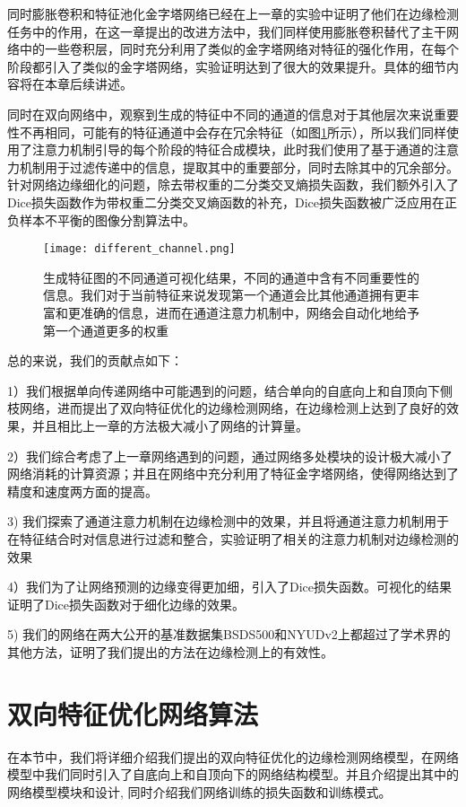 \documentclass[master]{thesis-uestc}
\begin{document}
{同时膨胀卷积和特征池化金字塔网络已经在上一章的实验中证明了他们在边缘检测任务中的作用，在这一章提出的改进方法中，我们同样使用膨胀卷积替代了主干网络中的一些卷积层，同时充分利用了类似的金字塔网络对特征的强化作用，在每个阶段都引入了类似的金字塔网络，实验证明达到了很大的效果提升。具体的细节内容将在本章后续讲述。

同时在双向网络中，观察到生成的特征中不同的通道的信息对于其他层次来说重要性不再相同，可能有的特征通道中会存在冗余特征（如图\ref{different_channel}所示），所以我们同样使用了注意力机制引导的每个阶段的特征合成模块，此时我们使用了基于通道的注意力机制用于过滤传递中的信息，提取其中的重要部分，同时去除其中的冗余部分。针对网络边缘细化的问题，除去带权重的二分类交叉熵损失函数，我们额外引入了Dice损失函数作为带权重二分类交叉熵函数的补充，Dice损失函数被广泛应用在正负样本不平衡的图像分割算法中。
\begin{figure}[h!]
    \texttt{[image: different\_channel.png]}
    \caption{生成特征图的不同通道可视化结果，不同的通道中含有不同重要性的信息。我们对于当前特征来说发现第一个通道会比其他通道拥有更丰富和更准确的信息，进而在通道注意力机制中，网络会自动化地给予第一个通道更多的权重}
    \label{different_channel}
\end{figure}

总的来说，我们的贡献点如下：

1）我们根据单向传递网络中可能遇到的问题，结合单向的自底向上和自顶向下侧枝网络，进而提出了双向特征优化的边缘检测网络，在边缘检测上达到了良好的效果，并且相比上一章的方法极大减小了网络的计算量。

2）我们综合考虑了上一章网络遇到的问题，通过网络多处模块的设计极大减小了网络消耗的计算资源；并且在网络中充分利用了特征金字塔网络，使得网络达到了精度和速度两方面的提高。

3) 我们探索了通道注意力机制在边缘检测中的效果，并且将通道注意力机制用于在特征结合时对信息进行过滤和整合，实验证明了相关的注意力机制对边缘检测的效果

4）我们为了让网络预测的边缘变得更加细，引入了Dice损失函数。可视化的结果证明了Dice损失函数对于细化边缘的效果。

5) 我们的网络在两大公开的基准数据集BSDS500和NYUDv2上都超过了学术界的其他方法，证明了我们提出的方法在边缘检测上的有效性。

\section{双向特征优化网络算法}
在本节中，我们将详细介绍我们提出的双向特征优化的边缘检测网络模型，在网络模型中我们同时引入了自底向上和自顶向下的网络结构模型。并且介绍提出其中的网络模型模块和设计, 同时介绍我们网络训练的损失函数和训练模式。

}
\end{document}
